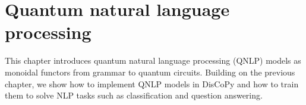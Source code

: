 
\chapter{Quantum natural language processing} \label{chapter-2:qnlp}

This chapter introduces quantum natural language processing (QNLP) models as monoidal functors from grammar to quantum circuits.
Building on the previous chapter, we show how to implement QNLP models in DisCoPy and how to train them to solve NLP tasks such as classification and question answering.
